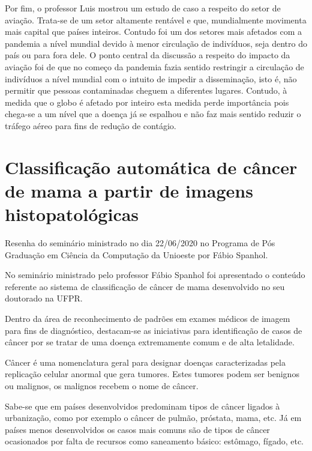 \documentclass[
	12pt,				%
	openright,			%
	twoside,			%
	a4paper,			%
	english,			%
	brazil,				%
	svgnames
	]{abntex2}\usepackage[]{graphicx}\usepackage[]{color}
\begin{document}
Por fim, o professor Luis mostrou um estudo de caso a respeito do setor de aviação. Trata-se de um setor altamente rentável e que, mundialmente movimenta mais capital que países inteiros. Contudo foi um dos setores mais afetados com a pandemia a nível mundial devido à menor circulação de indivíduos, seja dentro do país ou para fora dele. O ponto central da discussão a respeito do impacto da aviação foi de que no começo da pandemia fazia sentido restringir a circulação de indivíduos a nível mundial com o intuito de impedir a disseminação, isto é, não permitir que pessoas contaminadas cheguem a diferentes lugares. Contudo, à medida que o globo é afetado por inteiro esta medida perde importância pois chega-se a um nível que a doença já se espalhou e não faz mais sentido reduzir o tráfego aéreo para fins de redução de contágio.



\chapter{Classificação automática de câncer de mama a partir de imagens histopatológicas}
\label{cap:res10}


Resenha do seminário ministrado no dia 22/06/2020 no Programa de Pós Graduação em Ciência da Computação da Unioeste por Fábio Spanhol.

No seminário ministrado pelo professor Fábio Spanhol foi apresentado o conteúdo referente ao sistema de classificação de câncer de mama desenvolvido no seu doutorado na UFPR.

Dentro da área de reconhecimento de padrões em exames médicos de imagem para fins de diagnóstico, destacam-se as iniciativas para identificação de casos de câncer por se tratar de uma doença extremamente comum e de alta letalidade. 

Câncer é uma nomenclatura geral para designar doenças caracterizadas pela replicação celular anormal que gera tumores. Estes tumores podem ser benignos ou malignos, os malignos recebem o nome de câncer.

Sabe-se que em países desenvolvidos predominam tipos de câncer ligados à urbanização, como por exemplo o câncer de pulmão, próstata, mama, etc. Já em países menos desenvolvidos os casos mais comuns são de tipos de câncer ocasionados por falta de recursos como saneamento básico: estômago, fígado, etc.
\end{document}
